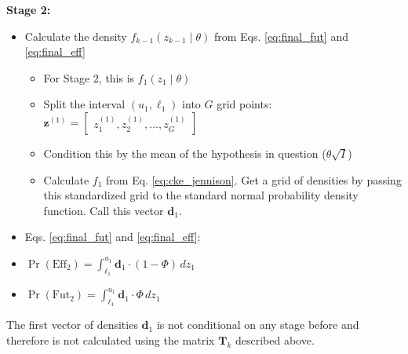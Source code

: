\documentclass{article}
\begin{document}
\textbf{Stage 2:}
\begin{itemize}[label={--}]
    \item Calculate the density $f_{k-1}(z_{k-1}\mid\theta)$ from Eqs. \eqref{eq:final_fut} and \eqref{eq:final_eff}
        \begin{itemize}[label={\raisebox{0.25ex}{\scalebox{0.75}{\textbullet}}}]
            \item For Stage 2, this is $f_{1}(z_{1}\mid\theta)$
            \item Split the interval $(u_1,\ell_1)$ into $G$ grid points: $\mathbf{z}^{(1)}=\begin{bmatrix}
                z_1^{(1)},z_2^{(1)},\dots,z_G^{(1)}
            \end{bmatrix}$
            \item Condition this by the mean of the hypothesis in question ($\theta\sqrt{I}$)
            \item Calculate $f_1$ from Eq. \eqref{eq:cke_jennison}. Get a grid of densities by passing this standardized grid to the standard normal probability density function. Call this vector $\mathbf{d}_1$.
       \end{itemize}
    \item[] Eqs. \eqref{eq:final_fut} and \eqref{eq:final_eff}:
    \item $\Pr(\mathrm{Eff_2})=\int_{\ell_{1}}^{u_{1}} \mathbf{d}_1 \cdot(1-\Phi)\,dz_1$
    \item $\Pr(\mathrm{Fut_2})=\int_{\ell_{1}}^{u_{1}} \mathbf{d}_1 \cdot \Phi\,dz_1$
\end{itemize}

The first vector of densities $\mathbf{d}_1$ is not conditional on any stage before and therefore is not calculated using the matrix $\mathbf{T}_k$ described above.
\end{document}
